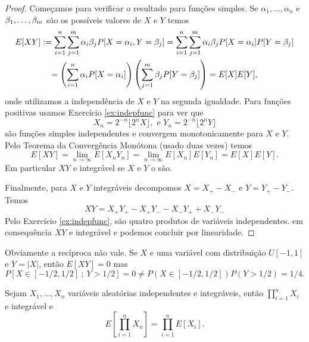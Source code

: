 \begin{proof}
Começamos para verificar o resultado para  funções simples. Se $\alpha_1,\dots,\alpha_n$ e $\beta_1,\dots,\beta_m$ são os possíveis valores de $X$ e $Y$
temos
\begin{multline}
 E[XY]:=\sum_{i=1}^n \sum_{j=1}^m \alpha_i \beta_j P[ X=\alpha_i, Y=\beta_j]
 =  \sum_{i=1}^n \sum_{j=1}^m \alpha_i \beta_j P[ X=\alpha_i] P[Y=\beta_j]\\ = \left( \sum_{i=1}^n \alpha_i P[ X=\alpha_i]\right)
 \left( \sum_{j=1}^m \beta_j P[Y=\beta_j] \right)=E[X]E[Y],
\end{multline}
onde utilizamos a independência de $X$ e $Y$ na segunda igualdade.
Para funções positivas usamos Exercício \ref{ex:indepfunc} para ver que
$$X_n= 2^{-n} \lfloor 2^n X \rfloor, \text{ e } Y_n= 2^{-n} \lfloor 2^n Y \rfloor $$
são funções simples independentes e convergem monotonicamente para $X$ e $Y$.
Pelo Teorema da Convergência Monótona (usado duas vezes) temos
\begin{equation}
 E[XY]=\lim_{n\to \infty} E[X_nY_n]=\lim_{n\to \infty} E[X_n] E[Y_n]=E[X]E[Y].
\end{equation}
Em particular $XY$ e integrável se $X$ e $Y$ o são.

\medskip

Finalmente, para $X$ e $Y$ integráveis decompomos $X = X_+ - X_-$ e $Y = Y_+ - Y_-$.
Temos
$$XY=X_+Y_+ - X_+Y_- - X_-Y_+ +X_-Y_-$$
Pelo Exercício \ref{ex:indepfunc}, são quatro produtos de variáveis independentes.
em consequência $XY$ e integrável e podemos  concluir por linearidade.
\end{proof}

\begin{remark}
 Obviamente a recíproca não vale. Se $X$ e uma variável com distribuição $U[-1,1]$ e
 $Y=|X|$, então $E[XY]=0$ mas
 $$P[X\in [-1/2,1/2] \ ; \ Y>1/2]=0\ne P(X\in [-1/2,1/2])P(Y>1/2)=1/4.$$


\end{remark}


\begin{corollary}
  Sejam $X_1,\dots,X_n$ variáveis aleatórias independentes e integráveis, então $\prod_{i=1}^n X_i$ e integrável e
  \begin{equation}
    E[\prod_{i=1}^n X_n] = \prod_{i=1}^n E[X_i].
  \end{equation}
  \end{corollary}

